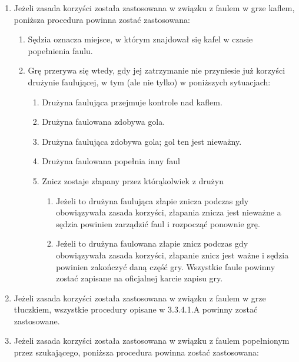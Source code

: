\documentclass[12pt]{article}
\begin{document}
\begin{enumerate}
\item
    Jeżeli zasada korzyści została zastosowana w związku z faulem w grze
  kaflem, poniższa procedura powinna zostać zastosowana:
  
  \begin{enumerate}
  \item
        Sędzia oznacza miejsce, w którym znajdował się kafel w czasie
    popełnienia faulu.
      \item
        Grę przerywa się wtedy, gdy jej zatrzymanie nie przyniesie już
    korzyści drużynie faulującej, w tym (ale nie tylko) w poniższych
    sytuacjach:
    
    \begin{enumerate}
    \item
            Drużyna faulująca przejmuje kontrole nad kaflem.
          \item
            Drużyna faulowana zdobywa gola.
          \item
            Drużyna faulująca zdobywa gola; gol ten jest nieważny.
          \item
            Drużyna faulowana popełnia inny faul
          \item
            Znicz zostaje złapany przez którąkolwiek z drużyn
      
      \begin{enumerate}
      \item
                Jeżeli to drużyna faulująca złapie znicza podczas gdy
        obowiązywała zasada korzyści, złapania znicza jest nieważne a
        sędzia powinien zarządzić faul i rozpocząć ponownie grę.
              \item
                Jeżeli to drużyna faulowana złapie znicz podczas gdy
        obowiązywała zasada korzyści, złapanie znicz jest ważne i sędzia
        powinien zakończyć daną część gry. Wszystkie faule powinny
        zostać zapisane na oficjalnej karcie zapisu gry.
              \end{enumerate}
    \end{enumerate}
  \end{enumerate}
\item
    Jeżeli zasada korzyści została zastosowana w związku z faulem w grze
  tłuczkiem, wszystkie procedury opisane w 3.3.4.1.A powinny zostać
  zastosowane.
  \item
    Jeżeli zasada korzyści została zastosowana w związku z faulem
  popełnionym przez szukającego, poniższa procedura powinna zostać
  zastosowana:
  

\end{enumerate}
\end{document}
